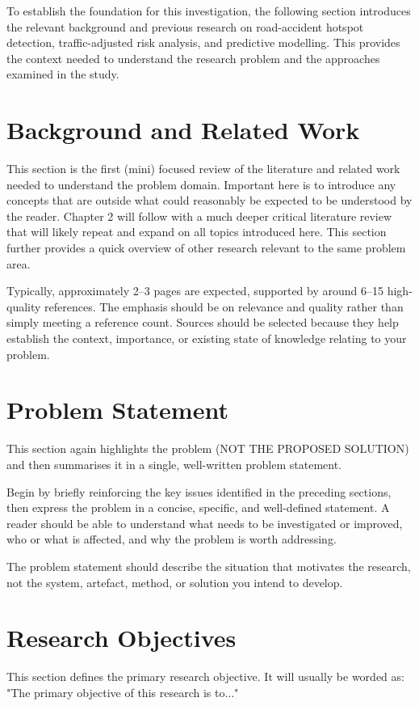To establish the foundation for this investigation, the following section introduces the relevant background and previous research on road-accident hotspot detection, traffic-adjusted risk analysis, and predictive modelling. This provides the context needed to understand the research problem and the approaches examined in the study.

\section{Background and Related Work}\label{sec:background-related-work}
This section is the first (mini) focused review of the literature and related work needed to understand the problem domain. Important here is to introduce any concepts that are outside what could  reasonably be expected to be understood by the reader. Chapter 2 will follow with a much deeper critical literature review that will likely repeat and expand on all topics introduced here. This section further provides a quick overview of other research relevant to the same problem area. 

Typically, approximately 2--3 pages are expected, supported by around 6--15 high-quality references. The emphasis should be on relevance and quality rather than simply meeting a reference count. Sources should be selected because they help establish the context, importance, or existing state of knowledge relating to your problem.

\section{Problem Statement}\label{sec:problem-statement}
This section again highlights the problem (NOT THE PROPOSED SOLUTION) and then summarises it in a single, well-written problem statement.

Begin by briefly reinforcing the key issues identified in the preceding sections, then express the problem in a concise, specific, and well-defined statement. A reader should be able to understand what needs to be investigated or improved, who or what is affected, and why the problem is worth addressing.

The problem statement should describe the situation that motivates the research, not the system, artefact, method, or solution you intend to develop.



\section{Research Objectives}\label{sec:research-objectives}
This section defines the primary research objective. It will usually be worded as: "The primary objective of this research is to..."

